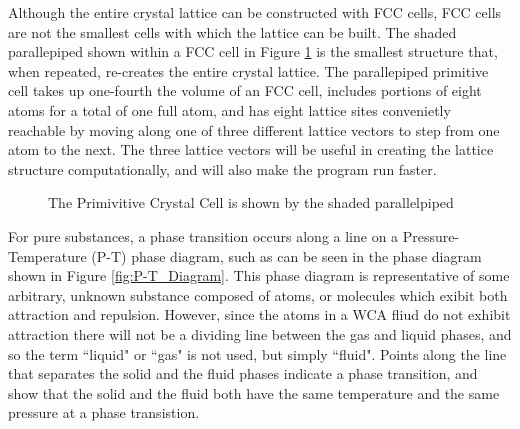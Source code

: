 \documentclass[double,12pt]{beavtex}
\begin{document}
Although the entire crystal lattice can be constructed with FCC cells, FCC cells are not the smallest cells with which the lattice can be built. The shaded parallepiped shown within a FCC cell in Figure \ref{fig:primitivecell_firsttime} is the smallest structure that, when repeated, re-creates the entire crystal lattice. The parallepiped primitive cell takes up one-fourth the volume of an FCC cell, includes portions of eight atoms for a total of one full atom, and has eight lattice sites convenietly reachable by moving along one of three different lattice vectors to step from one atom to the next. The three lattice vectors will be useful in creating the lattice structure computationally, and will also make the program run faster.

  \begin{figure}[h!]
    \centering
    \caption{The Primivitive Crystal Cell is shown by the shaded parallelpiped}
    \label{fig:primitivecell_firsttime}
  \end{figure}

For pure substances, a phase transition occurs along a line on a Pressure-Temperature (P-T) phase diagram, such as can be seen in the phase diagram shown in Figure \ref{fig:P-T_Diagram}. This phase diagram is representative of some arbitrary, unknown substance composed of atoms, or molecules which exibit both attraction and repulsion. However, since the atoms in a WCA fliud do not exhibit attraction there will not be a dividing line between the gas and liquid phases, and so the term ``liquid" or ``gas" is not used, but simply ``fluid". Points along the line that separates the solid and the fluid phases indicate a phase transition, and show that the solid and the fluid both have the same temperature and the same pressure at a phase transistion.
\end{document}
